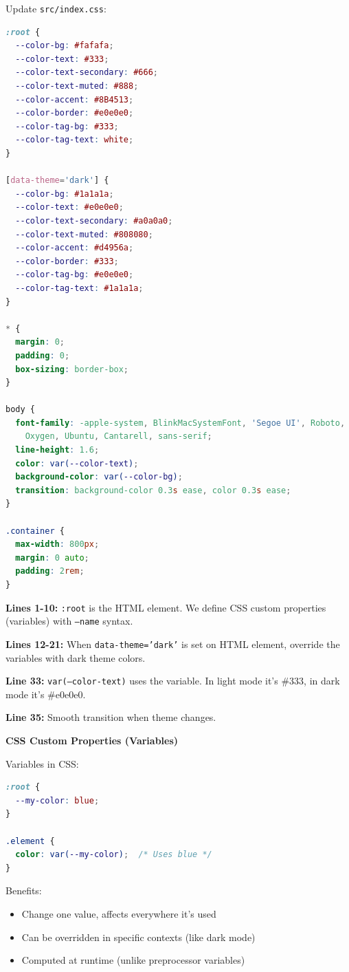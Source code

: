 \documentclass[12pt,a4paper]{article}
\begin{document}
Update \texttt{src/index.css}:

\begin{lstlisting}[language=CSS,caption={src/index.css with CSS custom properties}]
:root {
  --color-bg: #fafafa;
  --color-text: #333;
  --color-text-secondary: #666;
  --color-text-muted: #888;
  --color-accent: #8B4513;
  --color-border: #e0e0e0;
  --color-tag-bg: #333;
  --color-tag-text: white;
}

[data-theme='dark'] {
  --color-bg: #1a1a1a;
  --color-text: #e0e0e0;
  --color-text-secondary: #a0a0a0;
  --color-text-muted: #808080;
  --color-accent: #d4956a;
  --color-border: #333;
  --color-tag-bg: #e0e0e0;
  --color-tag-text: #1a1a1a;
}

* {
  margin: 0;
  padding: 0;
  box-sizing: border-box;
}

body {
  font-family: -apple-system, BlinkMacSystemFont, 'Segoe UI', Roboto,
    Oxygen, Ubuntu, Cantarell, sans-serif;
  line-height: 1.6;
  color: var(--color-text);
  background-color: var(--color-bg);
  transition: background-color 0.3s ease, color 0.3s ease;
}

.container {
  max-width: 800px;
  margin: 0 auto;
  padding: 2rem;
}
\end{lstlisting}

\begin{explanation}
\textbf{Lines 1-10:} \texttt{:root} is the HTML element. We define CSS custom properties (variables) with \texttt{--name} syntax.

\textbf{Lines 12-21:} When \texttt{data-theme='dark'} is set on HTML element, override the variables with dark theme colors.

\textbf{Line 33:} \texttt{var(--color-text)} uses the variable. In light mode it's \#333, in dark mode it's \#e0e0e0.

\textbf{Line 35:} Smooth transition when theme changes.
\end{explanation}

\begin{concept}
\textbf{CSS Custom Properties (Variables)}

Variables in CSS:
\begin{lstlisting}[language=CSS]
:root {
  --my-color: blue;
}

.element {
  color: var(--my-color);  /* Uses blue */
}
\end{lstlisting}

Benefits:
\begin{itemize}
    \item Change one value, affects everywhere it's used
    \item Can be overridden in specific contexts (like dark mode)
    \item Computed at runtime (unlike preprocessor variables)
\end{itemize}
\end{concept}
\end{document}
